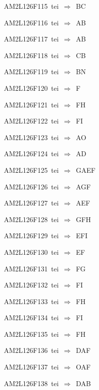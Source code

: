 {\sixrm AM2L126F115\ {\sixit tei}\ }$\Rightarrow$\ BC\par\smallskip
{\sixrm AM2L126F116\ {\sixit tei}\ }$\Rightarrow$\ AB\par\smallskip
{\sixrm AM2L126F117\ {\sixit tei}\ }$\Rightarrow$\ AB\par\smallskip
{\sixrm AM2L126F118\ {\sixit tei}\ }$\Rightarrow$\ CB\par\smallskip
{\sixrm AM2L126F119\ {\sixit tei}\ }$\Rightarrow$\ BN\par\smallskip
{\sixrm AM2L126F120\ {\sixit tei}\ }$\Rightarrow$\ F\par\smallskip
{\sixrm AM2L126F121\ {\sixit tei}\ }$\Rightarrow$\ FH\par\smallskip
{\sixrm AM2L126F122\ {\sixit tei}\ }$\Rightarrow$\ FI\par\smallskip
{\sixrm AM2L126F123\ {\sixit tei}\ }$\Rightarrow$\ AO\par\smallskip
{\sixrm AM2L126F124\ {\sixit tei}\ }$\Rightarrow$\ AD\par\smallskip
{\sixrm AM2L126F125\ {\sixit tei}\ }$\Rightarrow$\ GAEF\par\smallskip
{\sixrm AM2L126F126\ {\sixit tei}\ }$\Rightarrow$\ AGF\par\smallskip
{\sixrm AM2L126F127\ {\sixit tei}\ }$\Rightarrow$\ AEF\par\smallskip
{\sixrm AM2L126F128\ {\sixit tei}\ }$\Rightarrow$\ GFH\par\smallskip
{\sixrm AM2L126F129\ {\sixit tei}\ }$\Rightarrow$\ EFI\par\smallskip
{\sixrm AM2L126F130\ {\sixit tei}\ }$\Rightarrow$\ EF\par\smallskip
{\sixrm AM2L126F131\ {\sixit tei}\ }$\Rightarrow$\ FG\par\smallskip
{\sixrm AM2L126F132\ {\sixit tei}\ }$\Rightarrow$\ FI\par\smallskip
{\sixrm AM2L126F133\ {\sixit tei}\ }$\Rightarrow$\ FH\par\smallskip
{\sixrm AM2L126F134\ {\sixit tei}\ }$\Rightarrow$\ FI\par\smallskip
{\sixrm AM2L126F135\ {\sixit tei}\ }$\Rightarrow$\ FH\par\smallskip
{\sixrm AM2L126F136\ {\sixit tei}\ }$\Rightarrow$\ DAF\par\smallskip
{\sixrm AM2L126F137\ {\sixit tei}\ }$\Rightarrow$\ OAF\par\smallskip
{\sixrm AM2L126F138\ {\sixit tei}\ }$\Rightarrow$\ DAB\par\smallskip
